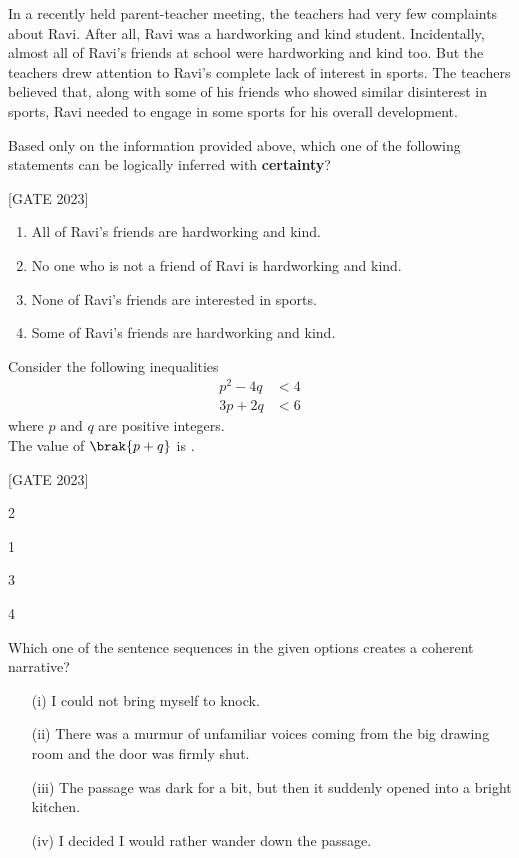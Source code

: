 \item In a recently held parent-teacher meeting, the teachers had very few complaints about Ravi. After all, Ravi was a hardworking and kind student. Incidentally, almost all of Ravi's friends at school were hardworking and kind too. But the teachers drew attention to Ravi's complete lack of interest in sports. The teachers believed that, along with some of his friends who showed similar disinterest in sports, Ravi needed to engage in some sports for his overall development.

Based only on the information provided above, which one of the following statements can be logically inferred with \textbf{certainty}?

\hfill{[GATE 2023]}\begin{enumerate}
    \item All of Ravi's friends are hardworking and kind.
    \item No one who is not a friend of Ravi is hardworking and kind.
    \item None of Ravi's friends are interested in sports.
    \item Some of Ravi's friends are hardworking and kind.
\end{enumerate}
 \item Consider the following inequalities
\begin{align*}
    p^2 - 4q &< 4 \\
    3p + 2q &< 6
\end{align*}
where $ p $ and $ q $ are positive integers.\\
The value of $ \brak{p + q} $ is \underline{\hspace{2cm}}.

\vspace{1em}

\hfill{[GATE 2023]}\begin{enumerate}\begin{multicols}{4}
    \item 2
    \item 1
    \item 3
    \item 4
    \end{multicols}
\end{enumerate}
\item Which one of the sentence sequences in the given options creates a coherent narrative?

\begin{enumerate}
    \item[(i)] I could not bring myself to knock.
    \item[(ii)] There was a murmur of unfamiliar voices coming from the big drawing room and the door was firmly shut.
    \item[(iii)] The passage was dark for a bit, but then it suddenly opened into a bright kitchen.
    \item[(iv)] I decided I would rather wander down the passage.
\end{enumerate}

